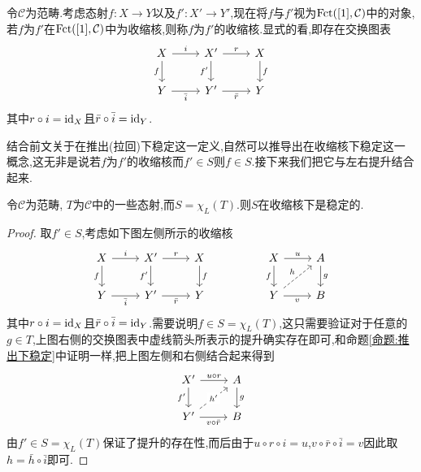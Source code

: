 \begin{definition}[态射作为收缩核]
    令$\mathcal{C}$为范畴.考虑态射$f: X \to Y$以及$f' : X' \to Y'$,现在将$f$与$f'$视为$\operatorname{Fct}([1],\mathcal{C})$中的对象,若$f$为$f'$在$\operatorname{Fct}([1],\mathcal{C})$中为收缩核,则称$f$为$f'$的收缩核.显式的看,即存在交换图表
    \[\begin{tikzcd}
	X & {X'} & X \\
	Y & {Y'} & Y
	\arrow["i", from=1-1, to=1-2]
	\arrow["f"', from=1-1, to=2-1]
	\arrow["r", from=1-2, to=1-3]
	\arrow["{f'}"', from=1-2, to=2-2]
	\arrow["f", from=1-3, to=2-3]
	\arrow["{\bar{i}}"', from=2-1, to=2-2]
	\arrow["{\bar{r}}"', from=2-2, to=2-3]
    \end{tikzcd}\]
    其中$r\circ i = \mathrm{id}_{X}$且$\bar{r}\circ \bar{i} = \mathrm{id}_{Y}$.
\end{definition}
结合前文关于在推出(拉回)下稳定这一定义,自然可以推导出在收缩核下稳定这一概念,这无非是说若$f$为$f'$的收缩核而$f'\in S$则$f\in S$.接下来我们把它与左右提升结合起来.
\begin{proposition}\label{命题:左提升收缩核稳定}
    令$\mathcal{C}$为范畴, $T$为$\mathcal{C}$中的一些态射,而$S = \chi_L(T)$.则$S$在收缩核下是稳定的.
\end{proposition}
\begin{proof}
    取$f'\in S$,考虑如下图左侧所示的收缩核
    \[\begin{tikzcd}
	X & {X'} & X && X & A \\
	Y & {Y'} & Y && Y & B
	\arrow["i", from=1-1, to=1-2]
	\arrow["f"', from=1-1, to=2-1]
	\arrow["r", from=1-2, to=1-3]
	\arrow["{f'}"', from=1-2, to=2-2]
	\arrow["f", from=1-3, to=2-3]
	\arrow["u", from=1-5, to=1-6]
	\arrow["f"', from=1-5, to=2-5]
	\arrow["g", from=1-6, to=2-6]
	\arrow["{\bar{i}}"', from=2-1, to=2-2]
	\arrow["{\bar{r}}"', from=2-2, to=2-3]
	\arrow["h", dashed, from=2-5, to=1-6]
	\arrow["v"', from=2-5, to=2-6]
    \end{tikzcd}\]
    其中$r\circ i = \mathrm{id}_{X}$且$\bar{r}\circ \bar{i} = \mathrm{id}_{Y}$.需要说明$f\in S = \chi_L(T)$,这只需要验证对于任意的$g\in T$,上图右侧的交换图表中虚线箭头所表示的提升确实存在即可,和命题\ref{命题:推出下稳定}中证明一样,把上图左侧和右侧结合起来得到
    \[\begin{tikzcd}
	{X'} & A \\
	{Y'} & B
	\arrow["{u\circ r}", from=1-1, to=1-2]
	\arrow["{f'}"', from=1-1, to=2-1]
	\arrow["g", from=1-2, to=2-2]
	\arrow["{h'}"{description}, dashed, from=2-1, to=1-2]
	\arrow["{v\circ \bar{r}}"', from=2-1, to=2-2]
    \end{tikzcd}\]
    由$f'\in S = \chi_L(T)$保证了提升的存在性,而后由于$u \circ r \circ i = u$,$v\circ \bar{r} \circ \bar{i} = v$因此取$h = \bar{h}\circ \bar{i}$即可.
\end{proof}
